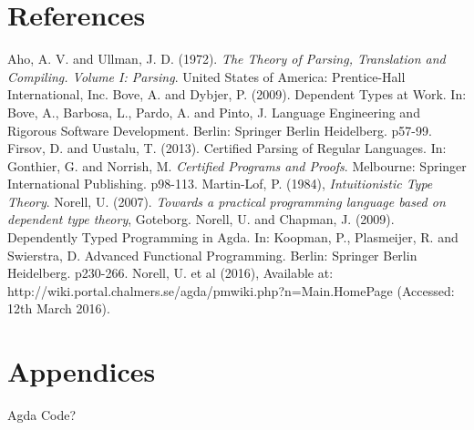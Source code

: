 \documentclass[twoside,openright,final]{bhamthesis}
\begin{document}
\newpage
\section*{References}
\begin{thebibliography}{9}
  Aho, A. V. and Ullman, J. D. (1972). \textit{The Theory of Parsing, Translation
  and Compiling. Volume I: Parsing}. United States of America:
  Prentice-Hall International, Inc.
  Bove, A. and Dybjer, P. (2009). Dependent Types at Work. In: Bove,
  A., Barbosa, L., Pardo, A. and Pinto, J. Language Engineering and
  Rigorous Software Development. Berlin: Springer Berlin
  Heidelberg. p57-99. 
  Firsov, D. and Uustalu, T. (2013). Certified Parsing of Regular
  Languages. In: Gonthier, G. and Norrish, M. \textit{Certified Programs and
  Proofs}. Melbourne: Springer International Publishing. p98-113. 
  Martin-Lof, P. (1984), \textit{Intuitionistic
  Type Theory}.
  Norell, U. (2007). \textit{Towards a practical programming language based on
  dependent type theory}, Goteborg.
  Norell, U. and Chapman, J. (2009). Dependently Typed Programming in
  Agda. In: Koopman, P., Plasmeijer, R. and Swierstra, D. Advanced
  Functional Programming. Berlin: Springer Berlin
  Heidelberg. p230-266. 
  Norell, U. et al (2016), Available at:
  http://wiki.portal.chalmers.se/agda/pmwiki.php?n=Main.HomePage
  (Accessed: 12th March 2016). 
\end{thebibliography}

\newpage
\section*{Appendices}
Agda Code?
\end{document}
